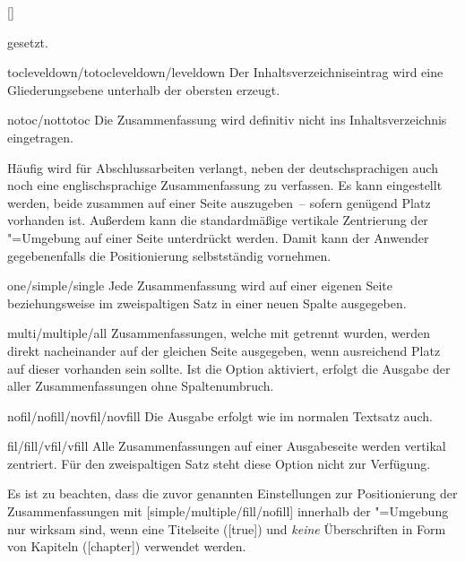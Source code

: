 \begin{Declaration}{[\PSet]}
\begin{values}
  gesetzt. 
\item[tocleveldown/totocleveldown/leveldown]
  Der Inhaltsverzeichniseintrag wird eine Gliederungsebene unterhalb der 
  obersten erzeugt.
\item[notoc/nottotoc]
  Die Zusammenfassung wird definitiv nicht ins Inhaltsverzeichnis eingetragen.
\end{values}
%
Häufig wird für Abschlussarbeiten verlangt, neben der deutschsprachigen 
auch noch eine englischsprachige Zusammenfassung zu verfassen. Es kann 
eingestellt werden, beide zusammen auf einer Seite auszugeben~-- sofern 
genügend Platz vorhanden ist. Außerdem kann die standardmäßige vertikale 
Zentrierung der "=Umgebung auf einer Seite unterdrückt 
werden. Damit kann der Anwender gegebenenfalls die Positionierung selbstständig 
vornehmen. 
%
\begin{values}
\item[one/simple/single]Jede Zusammenfassung wird auf einer eigenen Seite
  beziehungsweise im zweispaltigen Satz in einer neuen Spalte ausgegeben.
\item[multi/multiple/all]
  Zusammenfassungen, welche mit  getrennt wurden, werden 
  direkt nacheinander auf der gleichen Seite ausgegeben, wenn ausreichend Platz 
  auf dieser vorhanden sein sollte. Ist die Option  aktiviert,
  erfolgt die Ausgabe der aller Zusammenfassungen ohne Spaltenumbruch.
\item[nofil/nofill/novfil/novfill]
  Die Ausgabe erfolgt wie im normalen Textsatz auch.
\item[fil/fill/vfil/vfill]
  Alle Zusammenfassungen auf einer Ausgabeseite werden vertikal zentriert. Für 
  den zweispaltigen Satz steht diese Option nicht zur Verfügung.
\end{values}
Es ist zu beachten, dass die zuvor genannten Einstellungen zur Positionierung 
der Zusammenfassungen mit [simple/multiple/fill/nofill] 
innerhalb der "=Umgebung nur wirksam sind, wenn eine 
Titelseite ([true]) und \emph{keine} Überschriften in Form 
von Kapiteln ([chapter]) verwendet werden.
\end{Declaration}

